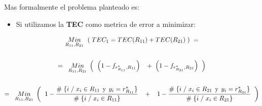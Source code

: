 \documentclass[
  11pt,
  a4paper,
]{article}
\providecommand{\tightlist}{%
  \setlength{\itemsep}{0pt}\setlength{\parskip}{0pt}}
\begin{document}
Mas formalmente el problema planteado es:

\begin{itemize}
\tightlist
\item
  Si utilizamos la \textbf{TEC} como metrica de error a minimizar:
\end{itemize}

\begin{gather*}
\underset{R_{11}  ,  R_{21}}  {Min} \hspace{0.15cm} \left(\hspace{0.1cm} TEC_1 = TEC(R_{11}) + TEC(R_{21})  \hspace{0.1cm}\right)   \hspace{0.1cm} =   \\ \\
=\hspace{0.2cm} \underset{R_{11}  ,  R_{21}}  {Min} \hspace{0.1cm} \left( \hspace{0.2cm}  \left( 1 - f_{r^*_{R_{11}} , R_{11}} \right)  \hspace{0.3cm} +  \hspace{0.1cm}    \left( 1 - f_{r^*_{R_{21}} , R_{21}} \right)  \hspace{0.2cm} \right)     \\ \\
=\hspace{0.2cm}   \underset{R_{11}  ,  R_{21}}  {Min} \hspace{0.1cm} \left( \hspace{0.2cm}    1 - \dfrac{\# \hspace{0.1 cm}\lbrace i \hspace{0.1 cm}/\hspace{0.1 cm} x_i \in R_{11} \hspace{0.15 cm}\text{y}\hspace{0.15 cm} y_i = r^*_{R_{11}} \rbrace}{\# \hspace{0.1 cm}\lbrace i \hspace{0.1 cm}/\hspace{0.1 cm} x_i \in R_{11}  \rbrace}  \hspace{0.3cm} +  \hspace{0.3cm}      1 - \dfrac{\# \hspace{0.1 cm}\lbrace i \hspace{0.1 cm}/\hspace{0.1 cm} x_i \in R_{21} \hspace{0.15 cm}\text{y}\hspace{0.15 cm} y_i = r^*_{R_{21}} \rbrace}{\# \hspace{0.1 cm}\lbrace i \hspace{0.1 cm}/\hspace{0.1 cm} x_i \in R_{21}  \rbrace}   \hspace{0.2cm} \right)     \\ \\

\end{gather*}
\end{document}
